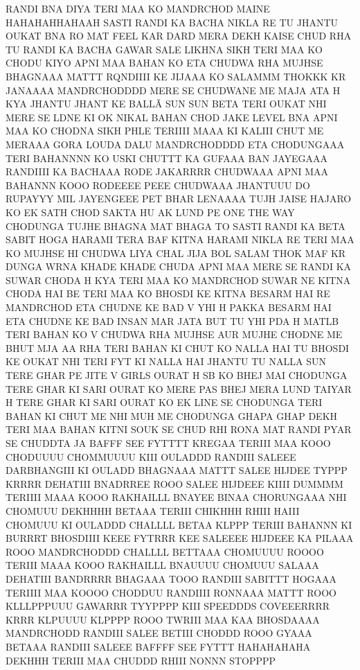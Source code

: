 RANDI BNA DIYA TERI MAA KO MANDRCHOD MAINE HAHAHAHHAHAAH
SASTI RANDI KA BACHA NIKLA RE TU JHANTU OUKAT BNA RO MAT 
FEEL KAR DARD MERA DEKH KAISE CHUD RHA TU
RANDI KA BACHA GAWAR SALE LIKHNA SIKH TERI MAA KO CHODU
KIYO APNI MAA BAHAN KO ETA CHUDWA RHA MUJHSE
BHAGNAAA MATTT RQNDIIII KE JIJAAA KO SALAMMM THOKKK KR JANAAAA MANDRCHODDDD
MERE SE CHUDWANE ME MAJA ATA H KYA JHANTU JHANT KE BALLÃ
SUN SUN BETA TERI OUKAT NHI MERE SE LDNE KI OK NIKAL
BAHAN CHOD JAKE LEVEL BNA APNI MAA KO CHODNA SIKH PHLE
TERIIII MAAA KI KALIII CHUT ME MERAAA GORA LOUDA DALU MANDRCHODDDD
ETA CHODUNGAAA TERI BAHANNNN KO USKI CHUTTT KA GUFAAA BAN JAYEGAAA
RANDIIII KA BACHAAA RODE JAKARRRR CHUDWAAA APNI MAA BAHANNN KOOO
RODEEEE PEEE CHUDWAAA JHANTUUU DO RUPAYYY MIL JAYENGEEE PET BHAR LENAAAA
TUJH JAISE HAJARO KO EK SATH CHOD SAKTA HU AK LUND PE
ONE THE WAY CHODUNGA TUJHE BHAGNA MAT
BHAGA TO SASTI RANDI KA BETA SABIT HOGA HARAMI
TERA BAF KITNA HARAMI NIKLA RE TERI MAA KO MUJHSE HI CHUDWA LIYA
CHAL JIJA BOL SALAM THOK MAF KR DUNGA
WRNA KHADE KHADE CHUDA APNI MAA MERE SE RANDI KA
SUWAR CHODA H KYA TERI MAA KO MANDRCHOD
SUWAR NE KITNA CHODA HAI BE TERI MAA KO BHOSDI KE
KITNA BESARM HAI RE MANDRCHOD ETA CHUDNE KE BAD V YHI H
PAKKA BESARM HAI ETA CHUDNE KE BAD INSAN MAR JATA BUT TU YHI PDA H
MATLB TERI BAHAN KO V CHUDWA RHA MUJHSE
AUR MUJHE CHODNE ME BHUT MJA AA RHA TERI BAHAN KI CHUT KO
NALLA HAI TU BHOSDI KE OUKAT NHI TERI FYT KI
NALLA HAI JHANTU TU NALLA SUN TERE GHAR PE JITE V GIRLS OURAT H SB KO BHEJ MAI CHODUNGA
TERE GHAR KI SARI OURAT KO MERE PAS BHEJ MERA LUND TAIYAR H
TERE GHAR KI SARI OURAT KO EK LINE SE CHODUNGA
TERI BAHAN KI CHUT ME NHI MUH ME CHODUNGA GHAPA GHAP
DEKH TERI MAA BAHAN KITNI SOUK SE CHUD RHI
RONA MAT RANDI PYAR SE CHUDDTA JA
BAFFF SEE FYTTTT KREGAA TERIII MAA KOOO CHODUUUU CHOMMUUUU KIII OULADDD
RANDIII SALEEE DARBHANGIII KI OULADD
BHAGNAAA MATTT SALEE HIJDEE TYPPP KRRRR
DEHATIII BNADRREE ROOO SALEE HIJDEEE KIIII DUMMMM
TERIIII MAAA KOOO RAKHAILLL BNAYEE BINAA CHORUNGAAA NHI CHOMUUU
DEKHHHH BETAAA TERIII CHIKHHH RHIII HAIII CHOMUUU KI OULADDD
CHALLLL BETAA KLPPP TERIII BAHANNN KI BURRRT
BHOSDIIII KEEE FYTRRR KEE SALEEEE
HIJDEEE KA PILAAA ROOO MANDRCHODDD
CHALLLL BETTAAA CHOMUUUU ROOOO
TERIII MAAA KOOO RAKHAILLL BNAUUUU CHOMUUU SALAAA
DEHATIII BANDRRRR
BHAGAAA TOOO RANDIII SABITTT HOGAAA TERIIII MAA KOOOO CHODDUU
RANDIIII RONNAAA MATTT ROOO KLLLPPPUUU GAWARRR
TYYPPPP KIII SPEEDDDS COVEEERRRR KRRR
KLPUUUU KLPPPP ROOO TWRIII MAA KAA BHOSDAAAA
MANDRCHODD
RANDIII SALEE BETIII CHODDD
ROOO GYAAA BETAAA
RANDIII SALEEE BAFFFF SEE FYTTT
HAHAHAHAHA
DEKHHH TERIII MAA CHUDDD RHIII NONNN STOPPPP

